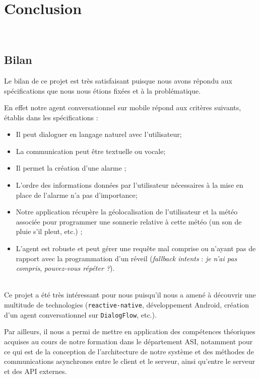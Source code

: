 \chapter*{Conclusion}
\thispagestyle{plain}
~\\[0.5cm]
{ \large

\section*{Bilan}
Le bilan de ce projet est très satisfaisant puisque nous avons répondu aux spécifications que nous nous étions fixées et à la problématique.

En effet notre agent conversationnel sur mobile répond aux critères suivants, établis dans les spécifications :
\begin{itemize}
	\item Il peut dialoguer en langage naturel avec l'utilisateur;
	\item La communication peut être textuelle ou vocale;
	\item Il permet la création d'une alarme ;
	\item L'ordre des informations données par l'utilisateur nécessaires à la mise en place de l'alarme n'a pas d'importance;
	\item Notre application récupère la géolocalisation de l'utilisateur et la météo associée pour programmer une sonnerie relative à cette météo (un son de pluie s'il pleut, etc.) ;
	\item L'agent est robuste et peut gérer une requête mal comprise ou n'ayant pas de rapport avec la programmation d'un réveil (\emph{fallback intents} : \og\emph{je n'ai pas compris}\fg, \og\emph{pouvez-vous répéter ?}\fg).
\end{itemize}

~\\\indent
Ce projet a été très intéressant pour nous puisqu'il nous a amené à découvrir une multitude de technologies (\texttt{reactive-native}, développement Android, création d'un agent conversationnel sur \texttt{DialogFlow}, etc.).

Par ailleurs, il nous a permi de mettre en application des compétences théoriques acquises au cours de notre formation dans le département ASI, notamment pour ce qui est de la conception de l'architecture de notre système et des méthodes de communications asynchrones entre le client et le serveur, ainsi qu'entre le serveur et des API externes.

}
